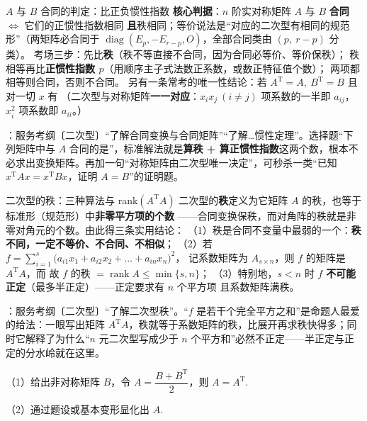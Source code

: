 \begin{fdeep}{$A$ 与 $B$ 合同的判定：比正负惯性指数}
\textbf{核心判据}：$n$ 阶实对称矩阵 $A$ 与 $B$ \textbf{合同} $\iff$ 它们的正惯性指数相同
\textbf{且}秩相同；等价说法是“对应的二次型有相同的规范形”（两矩阵必合同于
$\operatorname{diag}(E_p,-E_{r-p},O)$，全部合同类由 $(p,\ r-p)$ 分类）。
考场三步：先比\textbf{秩}（秩不等直接不合同，因为合同必等价、等价保秩）；
秩相等再比\textbf{正惯性指数 $p$}（用顺序主子式法数正系数，或数正特征值个数）；
两项都相等则合同，否则不合同。
另有一条常考的唯一性结论：若 $A^{\mathrm T}=A,\ B^{\mathrm T}=B$ 且对一切 $x$ 有
（二次型与对称矩阵\textbf{一一对应}：$x_ix_j\ (i\ne j)$ 项系数的一半即 $a_{ij}$，$x_i^{2}$ 项系数即 $a_{ii}$。）

\fbref{}：服务考纲〔二次型〕“了解合同变换与合同矩阵”“了解…惯性定理”。选择题“下列矩阵中与 $A$ 合同的是”，标准解法就是\textbf{算秩 + 算正惯性指数}这两个数，根本不必求出变换矩阵。再加一句“对称矩阵由二次型唯一决定”，可秒杀一类“已知 $x^{\mathrm T}Ax=x^{\mathrm T}Bx$，证明 $A=B$”的证明题。
\end{fdeep}

\begin{fdeep}{二次型的秩：三种算法与 rank$(A^{\mathrm T}A)$}
二次型的\textbf{秩}定义为它矩阵 $A$ 的秩，也等于标准形（规范形）中\textbf{非零平方项的个数}
——合同变换保秩，而对角阵的秩就是非零对角元的个数。由此得三条实用结论：
（1）秩是合同不变量中最弱的一个：\textbf{秩不同，一定不等价、不合同、不相似}；
（2）若 $f=\sum_{i=1}^{s}\bigl(a_{i1}x_1+a_{i2}x_2+\dots+a_{in}x_n\bigr)^{2}$，
记系数矩阵为 $A_{s\times n}$，则 $f$ 的矩阵是 $A^{\mathrm T}A$，而
故 $f$ 的秩 $=\operatorname{rank}A\le\min\{s,n\}$；
（3）特别地，$s<n$ 时 $f$ \textbf{不可能正定}（最多半正定）——正定要求有 $n$ 个平方项
且系数矩阵满秩。

\fbref{}：服务考纲〔二次型〕“了解二次型秩”。“$f$ 是若干个完全平方之和”是命题人最爱的给法：一眼写出矩阵 $A^{\mathrm T}A$，秩就等于系数矩阵的秩，比展开再求秩快得多；同时它解释了为什么“$n$ 元二次型写成少于 $n$ 个平方和”必然不正定——半正定与正定的分水岭就在这里。
\end{fdeep}


（1）给出非对称矩阵 $B$，令 $A=\dfrac{B+B^{\mathrm T}}{2}$，则 $A=A^{\mathrm T}$.

（2）通过题设或基本变形显化出 $A$.

